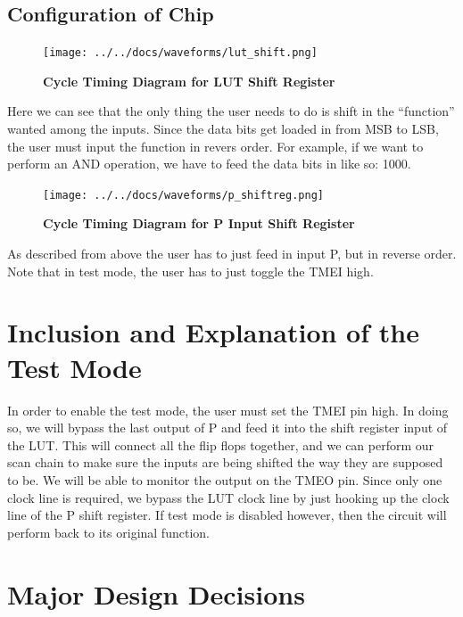 \documentclass[a4paper]{article}
\begin{document}
\subsection{\textbf{Configuration of Chip}}

    \begin{figure}[H]
        \centering
        \texttt{[image: ../../docs/waveforms/lut\_shift.png]}
        \caption{\textbf{Cycle Timing Diagram for LUT Shift Register}}
        \label{fig:gg}
    \end{figure}

    Here we can see that the only thing the user needs to do is shift in the ``function'' wanted among the inputs. Since
    the data bits get loaded in from MSB to LSB, the user must input the function in revers order. For example, if we
    want to perform an AND operation, we have to feed the data bits in like so: 1000.

    \begin{figure}[H]
        \centering
        \texttt{[image: ../../docs/waveforms/p\_shiftreg.png]}
        \caption{\textbf{Cycle Timing Diagram for P Input Shift Register}}
        \label{fig:gg}
    \end{figure}

    As described from above the user has to just feed in input P, but in reverse order. Note that in test mode, the
    user has to just toggle the TMEI high.

    \newpage

\section{\textbf{Inclusion and Explanation of the Test Mode}}

    In order to enable the test mode, the user must set the TMEI pin high. In doing so, we will bypass the last output
    of P and feed it into the shift register input of the LUT. This will connect all the flip flops together, and we can
    perform our scan chain to make sure the inputs are being shifted the way they are supposed to be. We will be able
    to monitor the output on the TMEO pin. Since only one clock line is required, we bypass the LUT clock line by just
    hooking up the clock line of the P shift register. If test mode is disabled however, then the circuit will perform
    back to its original function.

\section{\textbf{Major Design Decisions}}
\end{document}
